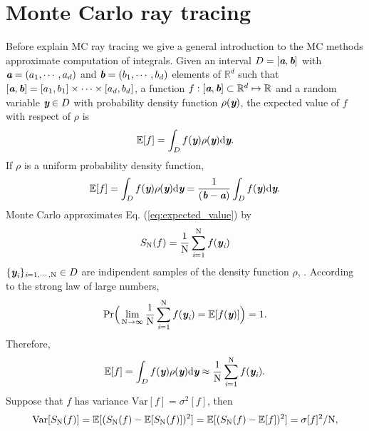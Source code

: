 \section{Monte Carlo ray tracing}
Before explain MC ray tracing we give a general introduction to the MC methods approximate computation of integrals. Given an interval $D = [\textit{\textbf{a}}, \textit{\textbf{b}}]$ with $\textit{\textbf{a}} = (a_1, \cdots, a_d)$ and $\textit{\textbf{b}} = (b_1, \cdots, b_d)$ elements of $\mathbb{R}^d$ such that
$[\textit{\textbf{a}}, \textit{\textbf{b}}]  = [a_1, b_1] \times \cdots \times [a_d, b_d]$, a function $f:[\textit{\textbf{a}},\textit{\textbf{b}}]\subset \mathbb{R}^d \mapsto \mathbb{R}$ and a random variable 
$\textit{\textbf{y}}\in D$ with probability density function $\rho(\textit{\textbf{y}})$, the expected value of $f$ with respect of $\rho$ is
\begin{equation}
\mathbb{E}[f] =\int_{D}f(\textit{\textbf{y}})\rho(\textit{\textbf{y}}) \textrm{d}\textit{\textbf{y}}.
\end{equation}
If $\rho$ is a uniform probability density function,
\begin{equation}\label{eq:expected_value}
\mathbb{E}[f] = \int_{D}f(\textit{\textbf{y}})\rho(\textit{\textbf{y}}) \textrm{d}\textit{\textbf{y}} =\frac{1}{(\textit{\textbf{b}}-\textit{\textbf{a}})} \int_{D}f(\textit{\textbf{y}}) \textrm{d}\textit{\textbf{y}}.
\end{equation}
Monte Carlo approximates Eq. (\ref{eq:expected_value}) by
\begin{equation}
S_{\textrm{N}}(f) = \frac{1}{\textrm{N}} \sum_{\textit{i}=1}^{\textrm{N}} f(\textit{\textbf{y}}_{\textit{i}})
\end{equation}
 $\{\textit{\textbf{y}}_{\textit{i}}\}_{\textit{i} = 1, \cdots, \textrm{N}}\in D$ are indipendent samples of the density function  $\rho$, \cite{owen2003quasi}.
According to the strong law of large numbers,
\begin{equation}
\textrm{Pr}\Big(\lim_{\textrm{N}\rightarrow\infty}\frac{1}{\textrm{N}}\sum_{\textit{i}=1}^{\textrm{N}} f(\textit{\textbf{y}}_{\textit{i}}) = \mathbb{E}[f(\textit{\textbf{y}})] \Big) = 1.
\end{equation}
Therefore,
\begin{equation}
\mathbb{E}[f] = \int_{D}f(\textit{\textbf{y}})\rho(\textit{\textbf{y}}) \textrm{d}\textit{\textbf{y}}  \approx \frac{1}{\textrm{N}} \sum_{\textit{i}=1}^{\textrm{N}} f(\textit{\textbf{y}}_{\textit{i}}).
\end{equation}
Suppose that $f$ has variance $\textrm{Var}[f]=\sigma^2[f] $, then
\begin{equation}
\textrm{Var}[S_{\textrm{N}}(f)] = \mathbb{E}[(S_{\textrm{N}}(f)-\mathbb{E}[S_{\textrm{N}}(f)])^2]= \mathbb{E}[(S_{\textrm{N}}(f)-\mathbb{E}[f])^2] = \sigma[f]^2/\textrm{N},
\end{equation}
